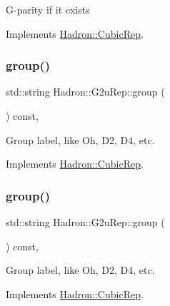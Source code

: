 G-\/parity if it exists 

Implements \mbox{\hyperlink{structHadron_1_1CubicRep_a52104e43266d1614c00bbd1c3b395458}{Hadron\+::\+Cubic\+Rep}}.

\mbox{\label{structHadron_1_1G2uRep_a6e7c7549e4d779122e5274dd0128687e}} 
\subsubsection{\texorpdfstring{group()}{group()}\hspace{0.1cm}{\footnotesize\ttfamily [1/2]}}
{\footnotesize\ttfamily std\+::string Hadron\+::\+G2u\+Rep\+::group (\begin{DoxyParamCaption}{ }\end{DoxyParamCaption}) const\hspace{0.3cm}{\ttfamily [inline]}, {\ttfamily [virtual]}}

Group label, like Oh, D2, D4, etc. 

Implements \mbox{\hyperlink{structHadron_1_1CubicRep_a0748f11ec87f387062c8e8981339a29c}{Hadron\+::\+Cubic\+Rep}}.

\mbox{\label{structHadron_1_1G2uRep_a6e7c7549e4d779122e5274dd0128687e}} 
\subsubsection{\texorpdfstring{group()}{group()}\hspace{0.1cm}{\footnotesize\ttfamily [2/2]}}
{\footnotesize\ttfamily std\+::string Hadron\+::\+G2u\+Rep\+::group (\begin{DoxyParamCaption}{ }\end{DoxyParamCaption}) const\hspace{0.3cm}{\ttfamily [inline]}, {\ttfamily [virtual]}}

Group label, like Oh, D2, D4, etc. 

Implements \mbox{\hyperlink{structHadron_1_1CubicRep_a0748f11ec87f387062c8e8981339a29c}{Hadron\+::\+Cubic\+Rep}}.

\mbox{\label{structHadron_1_1G2uRep_a1af743d771e5da3f6746dd72240a94c9}} 
